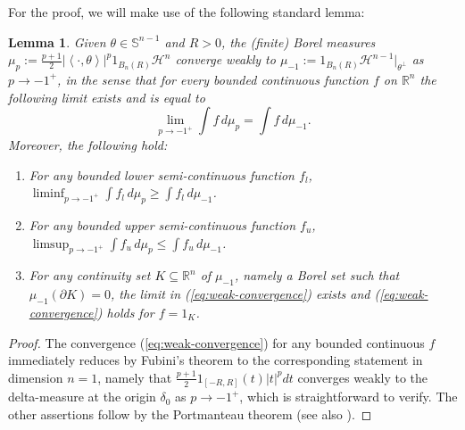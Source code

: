 \documentclass[11pt]{article}
\newtheorem{lemma}[thm]{Lemma}
\theoremstyle{definition}
\theoremstyle{proof}
\DeclareMathOperator{\+}{\mathop{\tilde{+}}}
\newcommand{\abs}[1]{\left\vert#1\right\vert}
\newcommand{\scalar}[1]{\left \langle #1 \right \rangle}
\newcommand{\R}{\mathbb{R}}
\renewcommand{\S}{\mathbb{S}}
\renewcommand{\H}{\mathcal{H}}
\numberwithin{equation}{section}
\numberwithin{equation}{section}
\begin{document}
For the proof, we will make use of the following standard lemma:
\begin{lemma} \label{lem:weak-convergence}
Given $\theta \in \S^{n-1}$ and $R > 0$, the (finite) Borel measures $\mu_p := \frac{p+1}{2} \abs{\scalar{\cdot,\theta}}^p 1_{B_n(R)} \H^n$ converge weakly to $\mu_{-1} := 1_{B_n(R)} \H^{n-1}|_{\theta^{\perp}}$ as $p \rightarrow -1^+$, in the sense that for every bounded continuous function $f$ on $\R^n$ the following limit exists and is equal to
\begin{equation} \label{eq:weak-convergence}
\lim_{p \rightarrow -1^+} \int f \, d\mu_p = \int f \, d\mu_{-1} . 
\end{equation}
Moreover, the following hold:
\begin{enumerate}
\item For any bounded lower semi-continuous function $f_l$, $\liminf_{p \rightarrow -1^+} \int f_l \, d\mu_p \geq \int f_l \, d\mu_{-1}$. 
\item For any bounded upper semi-continuous function $f_u$, $\limsup_{p \rightarrow -1^+} \int f_u \, d\mu_p \leq \int f_u \, d\mu_{-1}$. 
\item For any continuity set $K \subseteq \R^n$ of $\mu_{-1}$, namely a Borel set such that $\mu_{-1}(\partial K) = 0$, the limit in (\ref{eq:weak-convergence}) exists and (\ref{eq:weak-convergence}) holds for $f=1_K$. 
\end{enumerate}
\end{lemma}
\begin{proof}
The convergence (\ref{eq:weak-convergence}) for any bounded continuous $f$ immediately reduces by Fubini's theorem to the corresponding statement in dimension $n=1$, namely that $\frac{p+1}{2} 1_{[-R,R]}(t) |t|^p dt$ converges weakly to the delta-measure at the origin $\delta_0$ as $p \rightarrow -1^+$, which is straightforward to verify. The other assertions follow by the Portmanteau theorem \cite[Theorem 13.16]{KlenkeBook3rdEd} (see also \cite[Corollary 2.2.6]{Bogachev-WeakConvergenceBook}).
\end{proof}
\end{document}

